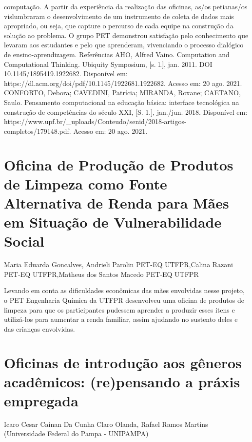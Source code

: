 computação. A partir da experiência da realização das oficinas, as/os petianas/os vislumbraram o
desenvolvimento de um instrumento de coleta de dados mais apropriado, ou seja, que capture o
percurso de cada equipe na construção da solução ao problema. O grupo PET demonstrou
satisfação pelo conhecimento que levaram aos estudantes e pelo que aprenderam, vivenciando o
processo dialógico de ensino-aprendizagem.
Referências
AHO, Alfred Vaino. Computation and Computational Thinking. Ubiquity Symposium, [s. l.],
jan. 2011. DOI 10.1145/1895419.1922682. Disponível em:
https://dl.acm.org/doi/pdf/10.1145/1922681.1922682. Acesso em: 20 ago. 2021.
CONFORTO, Debora; CAVEDINI, Patrícia; MIRANDA, Roxane; CAETANO, Saulo.
Pensamento computacional na educação básica: interface tecnológica na construção de
competências do século XXI, [S. 1.], jan./jun. 2018. Disponível em:
https://www.upf.br/_uploads/Conteudo/senid/2018-artigos-completos/179148.pdf. Acesso em:
20 ago. 2021.



\section{Oficina de Produção de Produtos de Limpeza como Fonte Alternativa de Renda para Mães em Situação de Vulnerabilidade Social}

Maria Eduarda Goncalves, Andrieli Parolin PET-EQ UTFPR,Calina Razani PET-EQ UTFPR,Matheus dos Santos Macedo PET-EQ UTFPR

Levando em conta as dificuldades econômicas das mães envolvidas nesse projeto, o PET Engenharia Química da UTFPR desenvolveu uma oficina de produtos de limpeza para que os participantes pudessem aprender a produzir esses itens e utilizá-los para aumentar a renda familiar, assim ajudando no sustento deles e das crianças envolvidas.



\section{Oficinas de introdução aos gêneros acadêmicos: (re)pensando a práxis empregada }

Icaro Cesar Cainan Da Cunha Claro Olanda, Rafael Ramos Martins (Universidade Federal do Pampa - UNIPAMPA)

